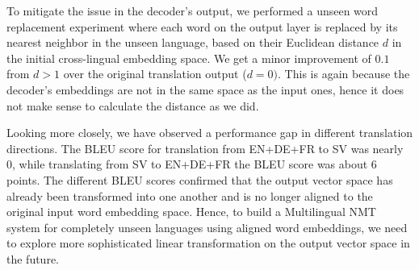 \documentclass[11pt,a4paper]{article}
\begin{document}

To mitigate the issue in the decoder's output, we performed a unseen word replacement experiment where each word on the output layer is replaced by its nearest neighbor in the unseen language, based on their Euclidean distance $d$ in the initial cross-lingual embedding space. 
We get a minor improvement of $0.1$ from $d>1$ over the original translation output ($d=0)$. 
This is again because the decoder's embeddings are not in the same space as the input ones, hence it does not make sense to calculate the distance as we did. 

Looking more closely, we have observed a performance gap in different translation directions. The BLEU score for translation from EN+DE+FR to SV was nearly 0, while translating from SV to EN+DE+FR the BLEU score was about 6 points. The different BLEU scores confirmed that the output vector space has already been transformed into one another and is no longer aligned to the original input word embedding space. Hence, to build a Multilingual NMT system for completely unseen languages using aligned word embeddings, we need to explore more sophisticated linear transformation on the output vector space in the future.


\end{document}
